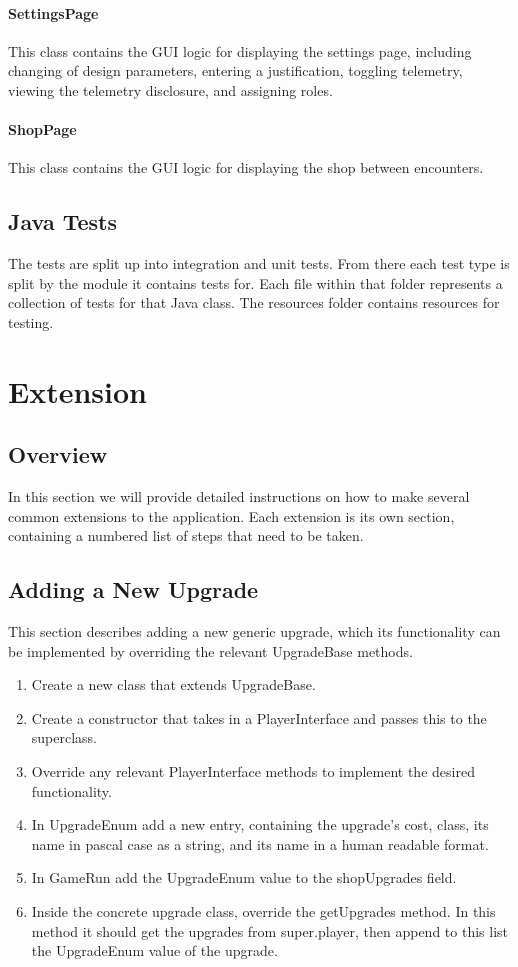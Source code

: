\documentclass[11pt]{article}
\begin{document}
\paragraph{SettingsPage}
This class contains the GUI logic for displaying the settings page, including changing of design parameters, entering a justification, toggling telemetry, viewing the telemetry disclosure, and assigning roles. 

\paragraph{ShopPage}
This class contains the GUI logic for displaying the shop between encounters. 

\subsection{Java Tests}
The tests are split up into integration and unit tests. From there each test type is split by the module it contains tests for. Each file within that folder represents a collection of tests for that Java class. The resources folder contains resources for testing. 

\section{Extension}

\subsection{Overview}
In this section we will provide detailed instructions on how to make several common extensions to the application. Each extension is its own section, containing a numbered list of steps that need to be taken.

\subsection{Adding a New Upgrade}
\label{sec:add_upgrade}
This section describes adding a new generic upgrade, which its functionality can be implemented by overriding the relevant UpgradeBase methods.

\begin{enumerate}
  \item Create a new class that extends UpgradeBase.
  \item Create a constructor that takes in a PlayerInterface and passes this to the superclass.
  \item Override any relevant PlayerInterface methods to implement the desired functionality.
  \item In UpgradeEnum add a new entry, containing the upgrade's cost, class, its name in pascal case as a string, and its name in a human readable format. 
  \item In GameRun add the UpgradeEnum value to the shopUpgrades field. 
  \item Inside the concrete upgrade class, override the getUpgrades method. In this method it should get the upgrades from super.player, then append to this list the UpgradeEnum value of the upgrade. 
\end{enumerate}
\end{document}
